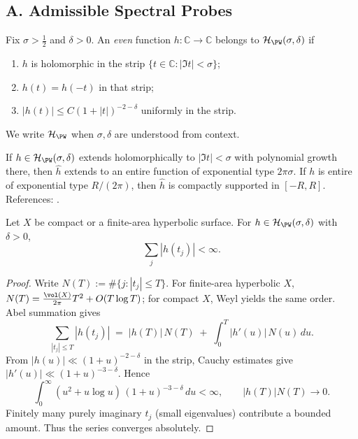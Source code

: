 \subsection*{A. Admissible Spectral Probes}
\label{subsec:admissible-h-sharp-patched}

\begin{definition}
\label{def:admissible-sharp-patched}
Fix $\sigma>\tfrac12$ and $\delta>0$. An \emph{even} function $h:\mathbb C\to\mathbb C$ belongs to $\mathcal H_{\PW}(\sigma,\delta)$ if
\begin{enumerate}[label=(\roman*)]
  \item $h$ is holomorphic in the strip $\{t\in\mathbb C:|\Im t|<\sigma\}$;
  \item $h(t)=h(-t)$ in that strip;
  \item $|h(t)|\le C(1+|t|)^{-2-\delta}$ uniformly in the strip.
\end{enumerate}
We write $\mathcal H_{\PW}$ when $\sigma,\delta$ are understood from context.
\end{definition}

\begin{remark}
\label{rem:PW}
If $h\in\mathcal H_{\PW}(\sigma,\delta)$ extends holomorphically to $|\Im t|<\sigma$ with polynomial growth there, then $\hat h$ extends to an entire function of exponential type $2\pi\sigma$. If $h$ is entire of exponential type $R/(2\pi)$, then $\hat h$ is compactly supported in $[-R,R]$. References: \cite{PaleyWiener1934,HelgasonGGA}.
\end{remark}

\begin{lemma}
\label{lem:absolute-sum-patched}
Let $X$ be compact or a finite-area hyperbolic surface. For $h\in\mathcal H_{\PW}(\sigma,\delta)$ with $\delta>0$,
\[
  \sum_{j} |h(t_j)| < \infty.
\]
\end{lemma}

\begin{proof}
Write $N(T):=\#\{j:|t_j|\le T\}$. For finite-area hyperbolic $X$, $N(T)=\frac{\vol(X)}{2\pi}T^2 + O(T\log T)$; for compact $X$, Weyl yields the same order. Abel summation gives
\[
  \sum_{|t_j|\le T} |h(t_j)| \;=\; |h(T)|\,N(T) \;+\; \int_0^T |h'(u)|\,N(u)\,du.
\]
From $|h(u)|\ll(1+u)^{-2-\delta}$ in the strip, Cauchy estimates give $|h'(u)|\ll(1+u)^{-3-\delta}$. Hence
\[
  \int_0^\infty (u^2+u\log u)\,(1+u)^{-3-\delta}\,du<\infty,\qquad
  |h(T)|N(T)\to0.
\]
Finitely many purely imaginary $t_j$ (small eigenvalues) contribute a bounded amount. Thus the series converges absolutely.
\end{proof}

